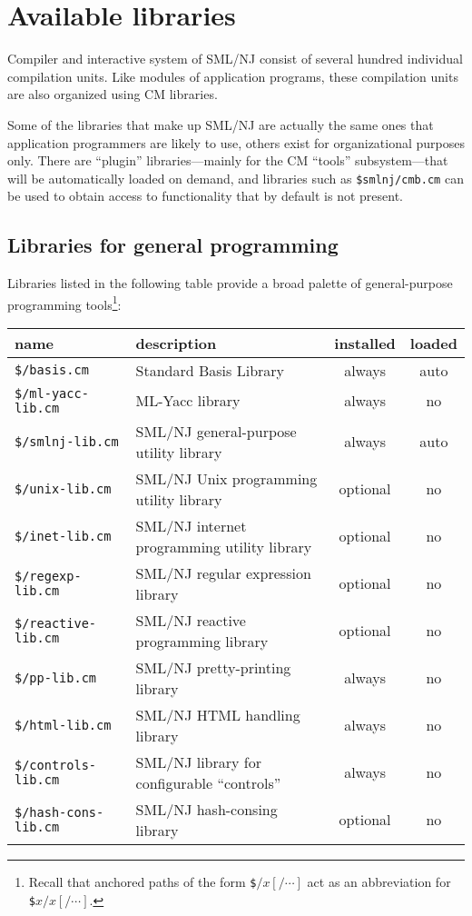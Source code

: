 %
\chapter{Available libraries}

Compiler and interactive system of SML/NJ consist of several hundred
individual compilation units.  Like modules of application programs,
these compilation units are also organized using CM libraries.

Some of the libraries that make up SML/NJ are actually the same ones
that application programmers are likely to use, others exist for
organizational purposes only.  There are ``plugin'' libraries---mainly
for the CM ``tools'' subsystem---that will be automatically loaded on
demand, and libraries such as {\tt \$smlnj/cmb.cm} can be used to
obtain access to functionality that by default is not present.

\section{Libraries for general programming}

Libraries listed in the following table provide a broad palette of
general-purpose programming tools\footnote{Recall that anchored paths
of the form {\tt \$$/x[/\cdots]$} act as an abbreviation for {\tt
\$$x/x[/\cdots]$}.}:

\begin{small}
\begin{center}
\begin{tabular}{p{1.7in}||p{3.4in}|c|c}
name & description & installed & loaded \\
\hline\hline
{\tt \$/basis.cm} & Standard Basis Library & always & auto \\
\hline\hline
{\tt \$/ml-yacc-lib.cm} & ML-Yacc library & always & no \\
\hline\hline
{\tt \$/smlnj-lib.cm} & SML/NJ general-purpose utility library &
always & auto \\
\hline
{\tt \$/unix-lib.cm} & SML/NJ Unix programming utility library &
optional & no \\
\hline
{\tt \$/inet-lib.cm} & SML/NJ internet programming utility library &
optional & no \\
\hline
{\tt \$/regexp-lib.cm} & SML/NJ regular expression library & optional
& no \\
\hline
{\tt \$/reactive-lib.cm} & SML/NJ reactive programming library &
optional & no \\
\hline
{\tt \$/pp-lib.cm} & SML/NJ pretty-printing library & always & no \\
\hline
{\tt \$/html-lib.cm} & SML/NJ HTML handling library & always & no \\
\hline
{\tt \$/controls-lib.cm} & SML/NJ library for configurable
``controls'' & always & no \\
\hline
{\tt \$/hash-cons-lib.cm} & SML/NJ hash-consing library & optional & no
\end{tabular}
\end{center}
\end{small}

